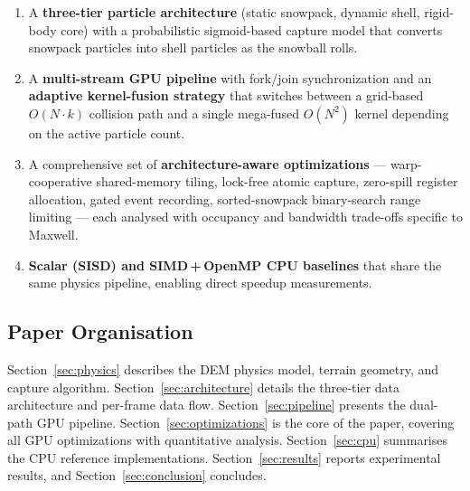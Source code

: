 \begin{enumerate}
  \item A \textbf{three-tier particle architecture} (static snowpack, dynamic
        shell, rigid-body core) with a probabilistic sigmoid-based capture model
        that converts snowpack particles into shell particles as the snowball
        rolls.
  \item A \textbf{multi-stream GPU pipeline} with fork/join synchronization
        and an \textbf{adaptive kernel-fusion strategy} that switches between a
        grid-based $O(N \cdot k)$ collision path and a single mega-fused
        $O(N^2)$ kernel depending on the active particle count.
  \item A comprehensive set of \textbf{architecture-aware optimizations}
        --- warp-cooperative shared-memory tiling, lock-free atomic capture,
        zero-spill register allocation, gated event recording, sorted-snowpack
        binary-search range limiting --- each analysed with occupancy and
        bandwidth trade-offs specific to Maxwell.
  \item \textbf{Scalar (SISD) and SIMD\,+\,OpenMP CPU baselines} that share
        the same physics pipeline, enabling direct speedup measurements.
\end{enumerate}

\subsection{Paper Organisation}

Section~\ref{sec:physics} describes the DEM physics model, terrain geometry,
and capture algorithm. Section~\ref{sec:architecture} details the three-tier
data architecture and per-frame data flow. Section~\ref{sec:pipeline} presents
the dual-path GPU pipeline. Section~\ref{sec:optimizations} is the core of the
paper, covering all GPU optimizations with quantitative analysis.
Section~\ref{sec:cpu} summarises the CPU reference implementations.
Section~\ref{sec:results} reports experimental results, and
Section~\ref{sec:conclusion} concludes.
